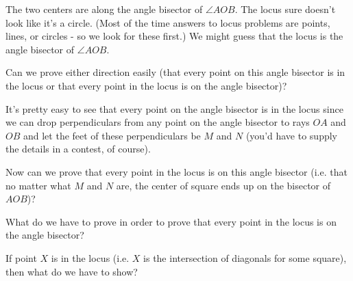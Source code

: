 





The two centers are along the angle bisector of $\angle AOB$. The locus sure doesn't look like it's a circle. (Most of the time answers to locus problems are points, lines, or circles - so we look for these first.)  We might guess that the locus is the angle bisector of $\angle AOB$.

Can we prove either direction easily (that every point on this angle bisector is in the locus or that every point in the locus is on the angle bisector)?



It's pretty easy to see that every point on the angle bisector is in the locus since we can drop perpendiculars from any point on the angle bisector to rays $OA$ and $OB$ and let the feet of these perpendiculars be $M$ and $N$ (you'd have to supply the details in a contest, of course).

Now can we prove that every point in the locus is on this angle bisector (i.e. that no matter what $M$ and $N$ are, the center of square ends up on the bisector of $AOB$)?

What do we have to prove in order to prove that every point in the locus is on the angle bisector?

If point $X$ is in the locus (i.e. $X$ is the intersection of diagonals for some square), then what do we have to show?

